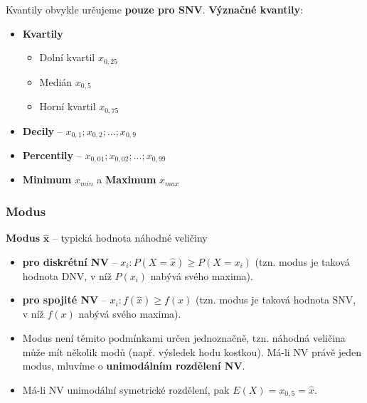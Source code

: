 \noindent Kvantily obvykle určujeme \textbf{pouze pro SNV}. \textbf{Význačné kvantily}:
\begin{itemize}
	\item \textbf{Kvartily}
	\begin{itemize}
		\item[] Dolní kvartil $x_{0,25}$
		\item[] Medián $x_{0,5}$
		\item[] Horní kvartil $x_{0,75}$
	\end{itemize}
	\item \textbf{Decily} -- $x_{0,1}; x_{0,2}; ... ;x_{0,9}$
	\item \textbf{Percentily} -- $x_{0,01}; x_{0,02}; ... ;x_{0,99}$
	\item \textbf{Minimum} $x_{min}$ a \textbf{Maximum} $x_{max}$
\end{itemize}

\subsubsection{Modus}
\textbf{Modus} $\mathbf{\hat{x}}$ -- typická hodnota náhodné veličiny
\begin{itemize}
\item \textbf{pro diskrétní NV} -- $x_i: P(X = \hat{x}) \geq P(X = x_i)$ (tzn. modus je taková hodnota DNV, v níž $P(x_i)$ nabývá svého maxima).
\item \textbf{pro spojité NV} -- $ x_i: f(\hat{x}) \geq f(x)$ (tzn. modus je taková hodnota SNV, v níž $f(x)$ nabývá svého maxima).
	\item Modus není těmito podmínkami určen jednoznačně, tzn. náhodná veličina může mít několik modů (např. výsledek hodu kostkou). Má-li NV právě jeden modus, mluvíme o \textbf{unimodálním rozdělení NV}.
	\item Má-li NV unimodální symetrické rozdělení, pak $E(X) = x_{0,5} = \hat{x}$.
\end{itemize}

